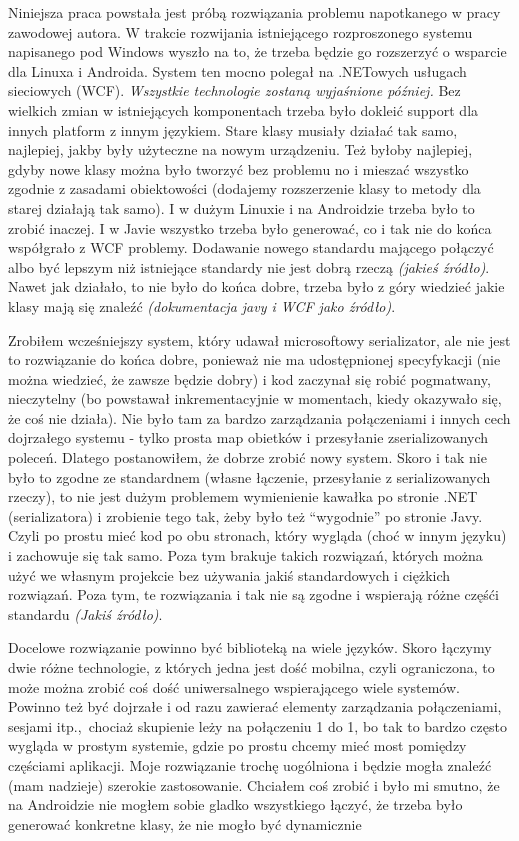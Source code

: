 \documentclass[twoside,a4paper]{book}
\begin{document}
Niniejsza praca powstała jest próbą rozwiązania problemu napotkanego w pracy zawodowej autora. W trakcie rozwijania istniejącego rozproszonego systemu napisanego pod Windows wyszło na to, że trzeba będzie go rozszerzyć o wsparcie dla Linuxa i Androida. System ten mocno polegał na .NETowych usługach sieciowych (WCF). \emph{Wszystkie technologie zostaną wyjaśnione później.} Bez wielkich zmian w istniejących komponentach trzeba było dokleić support dla innych platform z innym językiem. Stare klasy musiały działać tak samo, najlepiej, jakby były użyteczne na nowym urządzeniu. Też byłoby najlepiej, gdyby nowe klasy można było tworzyć bez problemu no i mieszać wszystko zgodnie z zasadami obiektowości (dodajemy rozszerzenie klasy to metody dla starej działają tak samo). I w dużym Linuxie i na Androidzie trzeba było to zrobić inaczej. I w Javie wszystko trzeba było generować, co i tak nie do końca współgrało z WCF problemy. Dodawanie nowego standardu mającego połączyć albo być lepszym niż istniejące standardy nie jest dobrą rzeczą \emph{(jakieś źródło)}. Nawet jak działało, to nie było do końca dobre, trzeba było z góry wiedzieć jakie klasy mają się znaleźć \emph{(dokumentacja javy i WCF jako źródło)}.

Zrobiłem wcześniejszy system, który udawał microsoftowy serializator, ale nie jest to rozwiązanie do końca dobre, ponieważ nie ma udostępnionej specyfykacji (nie można wiedzieć, że zawsze będzie dobry) i kod zaczynał się robić pogmatwany, nieczytelny (bo powstawał inkrementacyjnie w momentach, kiedy okazywało się, że coś nie działa). Nie było tam za bardzo zarządzania połączeniami i innych cech dojrzałego systemu - tylko prosta map obietków i przesyłanie zserializowanych poleceń. Dlatego postanowiłem, że dobrze zrobić nowy system. Skoro i tak nie było to zgodne ze standardnem (własne łączenie, przesyłanie z serializowanych rzeczy), to nie jest dużym problemem wymienienie kawałka po stronie .NET (serializatora) i zrobienie tego tak, żeby było też ``wygodnie'' po stronie Javy. Czyli po prostu mieć kod po obu stronach, który wygląda (choć w innym języku) i zachowuje się tak samo. Poza tym brakuje takich rozwiązań, których można użyć we własnym projekcie bez używania jakiś standardowych i ciężkich rozwiązań. Poza tym, te rozwiązania i tak nie są zgodne i wspierają różne częśći standardu \emph{(Jakiś źródło)}.

Docelowe rozwiązanie powinno być biblioteką na wiele języków. Skoro łączymy dwie różne technologie, z których jedna jest dość mobilna, czyli ograniczona, to może można zrobić coś dość uniwersalnego wspierającego wiele systemów. Powinno też być dojrzałe i od razu zawierać elementy zarządzania połączeniami, sesjami itp.,~chociaż skupienie leży na połączeniu 1 do 1, bo tak to bardzo często wygląda w prostym systemie, gdzie po prostu chcemy mieć most pomiędzy częściami aplikacji. Moje rozwiązanie trochę uogólniona i będzie mogła znaleźć (mam nadzieje) szerokie zastosowanie. Chciałem coś zrobić i było mi smutno, że na Androidzie nie mogłem sobie gladko wszystkiego łączyć, że trzeba było generować konkretne klasy, że nie mogło być dynamicznie
\end{document}
